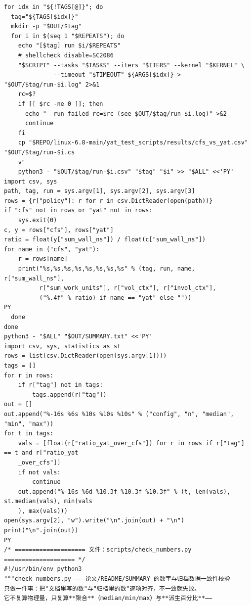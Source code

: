 \documentclass[10pt,a4paper]{article}
\newenvironment{yatpage}{\vspace*{0pt}}{\par}
\begin{document}
\newpage
\begin{yatpage}
\begin{Verbatim}[fontsize=\fontsize{8.2}{9.8}\selectfont]
for idx in "${!TAGS[@]}"; do
  tag="${TAGS[$idx]}"
  mkdir -p "$OUT/$tag"
  for i in $(seq 1 "$REPEATS"); do
    echo "[$tag] run $i/$REPEATS"
    # shellcheck disable=SC2086
    "$SCRIPT" --tasks "$TASKS" --iters "$ITERS" --kernel "$KERNEL" \
              --timeout "$TIMEOUT" ${ARGS[$idx]} > "$OUT/$tag/run-$i.log" 2>&1
    rc=$?
    if [[ $rc -ne 0 ]]; then
      echo "  run failed rc=$rc (see $OUT/$tag/run-$i.log)" >&2
      continue
    fi
    cp "$REPO/linux-6.8-main/yat_test_scripts/results/cfs_vs_yat.csv" "$OUT/$tag/run-$i.cs
    v"
    python3 - "$OUT/$tag/run-$i.csv" "$tag" "$i" >> "$ALL" <<'PY'
import csv, sys
path, tag, run = sys.argv[1], sys.argv[2], sys.argv[3]
rows = {r["policy"]: r for r in csv.DictReader(open(path))}
if "cfs" not in rows or "yat" not in rows:
    sys.exit(0)
c, y = rows["cfs"], rows["yat"]
ratio = float(y["sum_wall_ns"]) / float(c["sum_wall_ns"])
for name in ("cfs", "yat"):
    r = rows[name]
    print("%s,%s,%s,%s,%s,%s,%s,%s" % (tag, run, name, r["sum_wall_ns"],
          r["sum_work_units"], r["vol_ctx"], r["invol_ctx"],
          ("%.4f" % ratio) if name == "yat" else ""))
PY
  done
done
python3 - "$ALL" "$OUT/SUMMARY.txt" <<'PY'
import csv, sys, statistics as st
rows = list(csv.DictReader(open(sys.argv[1])))
tags = []
for r in rows:
    if r["tag"] not in tags:
        tags.append(r["tag"])
out = []
out.append("%-16s %6s %10s %10s %10s" % ("config", "n", "median", "min", "max"))
for t in tags:
    vals = [float(r["ratio_yat_over_cfs"]) for r in rows if r["tag"] == t and r["ratio_yat
    _over_cfs"]]
    if not vals:
        continue
    out.append("%-16s %6d %10.3f %10.3f %10.3f" % (t, len(vals), st.median(vals), min(vals
    ), max(vals)))
open(sys.argv[2], "w").write("\n".join(out) + "\n")
print("\n".join(out))
PY
/* ==================== 文件：scripts/check_numbers.py ==================== */
#!/usr/bin/env python3
"""check_numbers.py —— 论文/README/SUMMARY 的数字与归档数据一致性校验
只做一件事：把"文档里写的数"与"归档里的数"逐项对齐，不一致就失败。
它不复算物理量，只复算**聚合**（median/min/max）与**派生百分比**——
\end{Verbatim}
\end{yatpage}
\newpage
\end{document}
